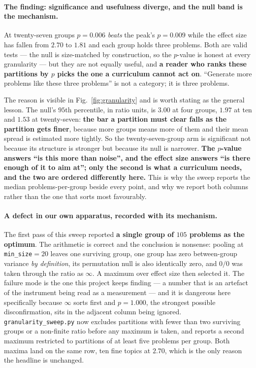 \paragraph{The finding: significance and usefulness diverge, and the null band is the
mechanism.} At twenty-seven groups $p=0.006$ \emph{beats} the peak's $p=0.009$ while the effect
size has fallen from $2.70$ to $1.81$ and each group holds three problems. Both are valid
tests --- the null is size-matched by construction, so the $p$-value is honest at every
granularity --- but they are not equally useful, and \textbf{a reader who ranks these
partitions by $p$ picks the one a curriculum cannot act on}. ``Generate more problems like
these three problems'' is not a category; it is three problems.

The reason is visible in Fig.~\ref{fig:granularity} and is worth stating as the general lesson.
The null's $95$th percentile, in ratio units, is $3.00$ at four groups, $1.97$ at ten and
$1.53$ at twenty-seven: \textbf{the bar a partition must clear falls as the partition gets
finer}, because more groups means more of them and their mean spread is estimated more
tightly. So the twenty-seven-group arm is significant not because its structure is stronger but
because its null is narrower. \textbf{The $p$-value answers ``is this more than noise'', and
the effect size answers ``is there enough of it to aim at''; only the second is what a
curriculum needs, and the two are ordered differently here.} This is why the sweep reports the
median problems-per-group beside every point, and why we report both columns rather than the
one that sorts most favourably.

\paragraph{A defect in our own apparatus, recorded with its mechanism.} The first pass of this
sweep reported \textbf{a single group of $105$ problems as the optimum}. The arithmetic is
correct and the conclusion is nonsense: pooling at \texttt{min\_size}$=20$ leaves one surviving
group, one group has zero between-group variance \emph{by definition}, its permutation null is
also identically zero, and $0/0$ was taken through the ratio as $\infty$. A maximum over
effect size then selected it. The failure mode is the one this project keeps finding --- a
number that is an artefact of the instrument being read as a measurement --- and it is
dangerous here specifically because $\infty$ sorts first and $p=1.000$, the strongest possible
disconfirmation, sits in the adjacent column being ignored. \texttt{granularity\_sweep.py} now
excludes partitions with fewer than two surviving groups or a non-finite ratio before any
maximum is taken, and reports a second maximum restricted to partitions of at least five
problems per group. Both maxima land on the same row, ten fine topics at $2.70$, which is the
only reason the headline is unchanged.

